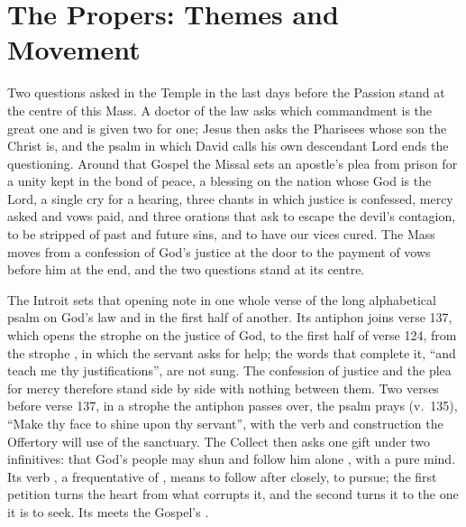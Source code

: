 
\section{The Propers: Themes and Movement}

Two questions asked in the Temple in the last days before the Passion stand at
the centre of this Mass. A doctor of the law asks which commandment is the great one and is
given two for one; Jesus then asks the Pharisees whose son the Christ is, and
the psalm in which David calls his own descendant Lord ends the questioning.
Around that Gospel the Missal sets an apostle's plea from prison for a unity
kept in the bond of peace, a blessing on the nation whose God is the Lord, a
single cry for a hearing, three chants in which justice is confessed, mercy
asked and vows paid, and three orations that ask to escape the devil's
contagion, to be stripped of past and future sins, and to have our vices
cured. The Mass moves from a confession of God's justice at the door to the
payment of vows before him at the end, and the two questions stand at its
centre.

The Introit sets that opening note in one whole verse of the long alphabetical
psalm on God's law and in the first half of another. Its antiphon joins verse 137,
which opens the strophe  on the justice of God, to the first half of
verse 124, from the strophe , in which the servant asks for help; the
words that complete it, ``and teach me thy justifications'', are not sung. The
confession of justice and the plea for mercy therefore stand side by side with
nothing between them. Two verses before verse 137, in a strophe the antiphon
passes over, the psalm prays 
(v.~135), ``Make thy face to shine upon thy servant'', with the verb and
construction the Offertory will use of the sanctuary. The Collect then asks
one gift under two infinitives: that God's people may shun  and follow him alone , with a pure mind. Its verb
, a frequentative of , means to follow after
closely, to pursue; the first petition turns the heart from what corrupts it,
and the second turns it to the one it is to seek. Its  meets the
Gospel's .


